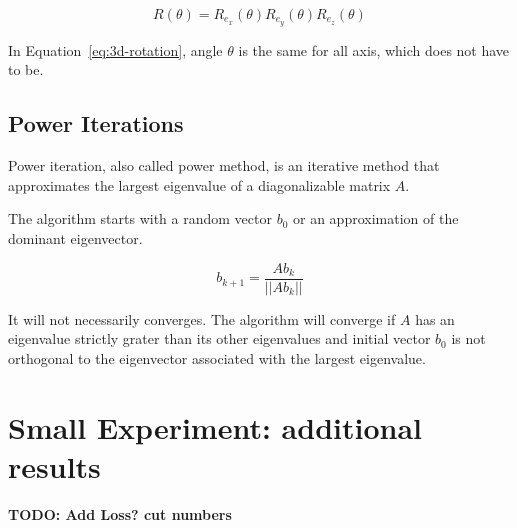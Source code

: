 \begin{equation}
    \label{eq:3d-rotation}
    R (\theta) = R_{e_x} (\theta) R_{e_y} (\theta) R_{e_z} (\theta)
\end{equation}

In Equation~\ref{eq:3d-rotation}, angle $\theta$ is the same for all axis, which does not have to be.


\subsection{Power Iterations}
\label{sec:powerIterations}

Power iteration, also called power method, is an iterative method
that approximates the largest eigenvalue of a diagonalizable matrix $A$.

The algorithm starts with a random vector $b_0$ or an approximation of the dominant eigenvector.

\begin{equation}
    \label{eq:powerIterations}
    b_{k+1} = \frac{Ab_k}{||Ab_k||}
\end{equation}

It will not necessarily converges. The algorithm will converge if $A$ has an eigenvalue strictly grater than its other eigenvalues
and initial vector $b_0$ is not orthogonal to the eigenvector associated with the largest eigenvalue.

\section{Small Experiment: additional results}

\textbf{TODO: Add Loss? cut numbers}

